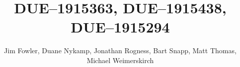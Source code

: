 \documentclass[final]{beamer}
\title{DUE--1915363, DUE--1915438, DUE--1915294}
\author{Jim Fowler, Duane Nykamp, Jonathan Rogness, Bart Snapp, Matt Thomas, Michael Weimerskirch}
\begin{document}
{

\newenvironment{sectionblock}[1]{\begin{block}{\rule{0pt}{1in}#1}}{\end{block}}

\begin{frame}[fragile]{}
  \begin{columns}[t]

    \begin{column}{0.32\linewidth}
      
    \end{column}%

    \begin{column}{0.32\linewidth}
      
    \end{column}%

    \begin{column}{0.32\linewidth}
      
    \end{column}
 
  \end{columns}
\end{frame}
}
\end{document}
